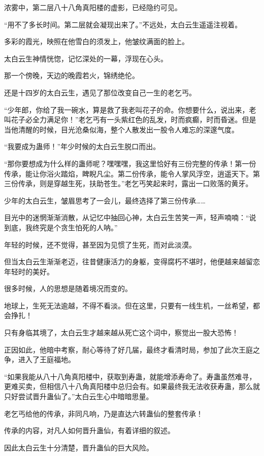 \begin{this_body}
浓雾中，第二层八十八角真阳楼的虚影，已经隐约可见。

“用不了多长时间。第二层就会凝现出来了。”不远处，太白云生遥遥注视着。

多彩的霞光，映照在他雪白的须发上，他皱纹满面的脸上。

太白云生神情恍惚，记忆深处的一幕，浮现在心头。

那一个傍晚，天边的晚霞若火，锦绣绝伦。

还是十四岁的太白云生，遇见了那位改变自己一生的老乞丐。

“少年郎，你给了我一碗水，算是救了我老叫花子的命。你想要什么，说出来，老叫花子必全力满足你！”老乞丐有一头紫红色的乱发，时而疯癫，时而昏迷。但是当他清醒的时候，目光沧桑似海，整个人散发出一股令人难忘的深邃气度。

“我要成为蛊师！”年少时候的太白云生脱口而出。

“那你要想成为什么样的蛊师呢？嘿嘿嘿，我这里恰好有三份完整的传承！第一份传承，能让你浴火踏焰，睥睨凡尘。第二份传承，能令人掌风浮空，逍遥天下。第三份传承，则是穿越生死，扶助苍生。”老乞丐笑起来时，露出一口败落的黄牙。

少年的太白云生，皱眉思考了一会儿，最终选择了第三份传承……

目光中的迷惘渐渐消散，从记忆中抽回心神，太白云生苦笑一声，轻声喃喃：“说到底，我终究是个贪生怕死的人呐。”

年轻的时候，还不觉得，甚至因为见惯了生死，而对此淡漠。

但当太白云生渐渐老迈，往昔健康活力的身躯，变得腐朽不堪时，他便越来越留恋年轻时的美好。

很多时候，人的思想是随着境况而变的。

地球上，生死无法逾越，不得不看淡。但在这里，只要有一线生机，一丝希望，都会挣扎！

只有身临其境了，太白云生才越来越从死亡这个词中，察觉出一股大恐怖！

正因如此，他暗中考察，耐心等待了好几届，最终才看清时局，参加了此次王庭之争，进入了王庭福地。

“如果我能从八十八角真阳楼中，获取到寿蛊，就能增添寿命了。寿蛊虽然难寻，更难买卖，但相信八十八角真阳楼中总归会有。如果最终我无法收获寿蛊，那么就只好尝试晋升蛊仙了。”太白云生心中暗暗思量。

老乞丐给他的传承，非同凡响，乃是直达六转蛊仙的整套传承！

传承的内容，对凡人如何晋升蛊仙，有着详细的叙述。

因此太白云生十分清楚，晋升蛊仙的巨大风险。


\end{this_body}
